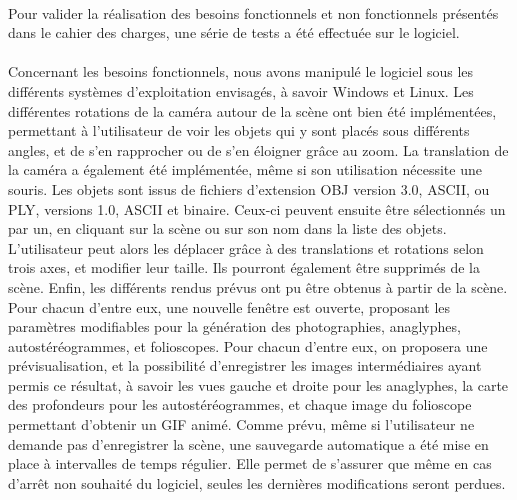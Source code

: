 \paragraph{}
Pour valider la réalisation des besoins fonctionnels et non fonctionnels présentés dans le cahier des charges, une série de tests a été effectuée sur le logiciel.

\paragraph{}
Concernant les besoins fonctionnels, nous avons manipulé le logiciel sous les différents systèmes d'exploitation envisagés, à savoir Windows et Linux.
Les différentes rotations de la caméra autour de la scène ont bien été implémentées, permettant à l'utilisateur de voir les objets qui y sont placés sous différents angles, et de s'en rapprocher ou de s'en éloigner grâce au zoom. La translation de la caméra a également été implémentée, même si son utilisation nécessite une souris.
Les objets sont issus de fichiers d'extension OBJ version 3.0, ASCII, ou PLY, versions 1.0, ASCII et binaire. Ceux-ci peuvent ensuite être sélectionnés un par un, en cliquant sur la scène ou sur son nom dans la liste des objets. L'utilisateur peut alors les déplacer grâce à des translations et rotations selon trois axes, et modifier leur taille. Ils pourront également être supprimés de la scène.
Enfin, les différents rendus prévus ont pu être obtenus à partir de la scène. Pour chacun d'entre eux, une nouvelle fenêtre est ouverte, proposant les paramètres modifiables pour la génération des photographies, anaglyphes, autostéréogrammes, et folioscopes. Pour chacun d'entre eux, on proposera une prévisualisation, et la possibilité d'enregistrer les images intermédiaires ayant permis ce résultat, à savoir les vues gauche et droite pour les anaglyphes, la carte des profondeurs pour les autostéréogrammes, et chaque image du folioscope permettant d'obtenir un GIF animé.
Comme prévu, même si l'utilisateur ne demande pas d'enregistrer la scène, une sauvegarde automatique a été mise en place à intervalles de temps régulier. Elle permet de s'assurer que même en cas d'arrêt non souhaité du logiciel, seules les dernières modifications seront perdues.

